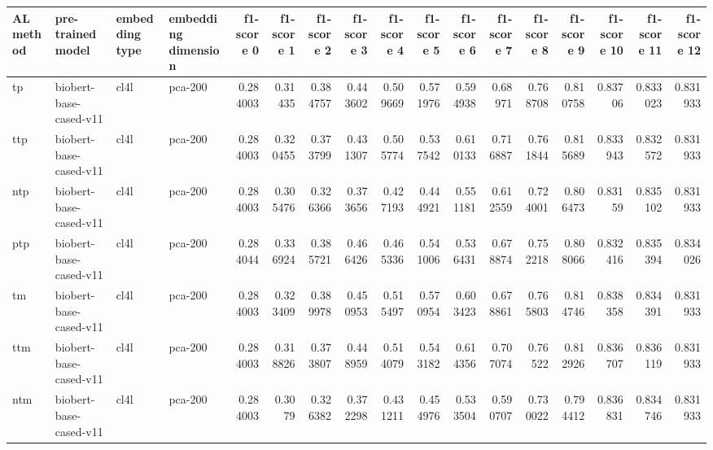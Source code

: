 \begin{tabular}{llllrrrrrrrrrrrrr}
\hline
 AL method   & pre-trained model      & embedding type   & embedding dimension   &   f1-score 0 &   f1-score 1 &   f1-score 2 &   f1-score 3 &   f1-score 4 &   f1-score 5 &   f1-score 6 &   f1-score 7 &   f1-score 8 &   f1-score 9 &   f1-score 10 &   f1-score 11 &   f1-score 12 \\
\hline
 tp          & biobert-base-cased-v11 & cl4l             & pca-200               &     0.284003 &     0.31435  &     0.384757 &     0.443602 &     0.509669 &     0.571976 &     0.594938 &     0.68971  &     0.768708 &     0.810758 &      0.83706  &      0.833023 &      0.831933 \\
 ttp         & biobert-base-cased-v11 & cl4l             & pca-200               &     0.284003 &     0.320455 &     0.373799 &     0.431307 &     0.505774 &     0.537542 &     0.610133 &     0.716887 &     0.761844 &     0.815689 &      0.833943 &      0.832572 &      0.831933 \\
 ntp         & biobert-base-cased-v11 & cl4l             & pca-200               &     0.284003 &     0.305476 &     0.326366 &     0.373656 &     0.427193 &     0.444921 &     0.551181 &     0.612559 &     0.724001 &     0.806473 &      0.83159  &      0.835102 &      0.831933 \\
 ptp         & biobert-base-cased-v11 & cl4l             & pca-200               &     0.284044 &     0.336924 &     0.385721 &     0.466426 &     0.465336 &     0.541006 &     0.536431 &     0.678874 &     0.752218 &     0.808066 &      0.832416 &      0.835394 &      0.834026 \\
 tm          & biobert-base-cased-v11 & cl4l             & pca-200               &     0.284003 &     0.323409 &     0.389978 &     0.450953 &     0.515497 &     0.570954 &     0.603423 &     0.678861 &     0.765803 &     0.814746 &      0.838358 &      0.834391 &      0.831933 \\
 ttm         & biobert-base-cased-v11 & cl4l             & pca-200               &     0.284003 &     0.318826 &     0.373807 &     0.448959 &     0.514079 &     0.543182 &     0.614356 &     0.707074 &     0.76522  &     0.812926 &      0.836707 &      0.836119 &      0.831933 \\
 ntm         & biobert-base-cased-v11 & cl4l             & pca-200               &     0.284003 &     0.3079   &     0.326382 &     0.372298 &     0.431211 &     0.454976 &     0.533504 &     0.590707 &     0.730022 &     0.794412 &      0.836831 &      0.834746 &      0.831933 \\

\end{tabular}
